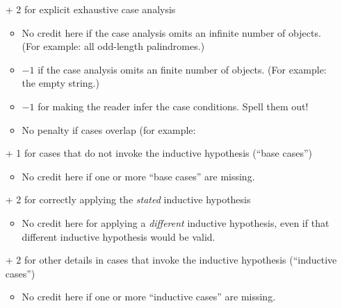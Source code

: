 \documentclass[11pt]{article}
\begin{document}
\begin{enumerate}
\begin{rubric}[induction]
\begin{itemize}
\item[+] 2 for explicit exhaustive case analysis
\begin{itemize}\itemsep0pt
\item No credit here if the case analysis omits an infinite number of objects.  (For example: all odd-length palindromes.)
\item $-1$ if the case analysis omits an finite number of objects.  (For example: the empty string.)
\item $-1$ for making the reader infer the case conditions.  Spell them out!
\item No penalty if cases overlap (for example:
\end{itemize}

\item[+] 1 for cases that do not invoke the inductive hypothesis (“base cases”)
\begin{itemize}\itemsep0pt
\item No credit here if one or more “base cases” are missing.
\end{itemize}

\item[+] 2 for correctly applying the \emph{stated} inductive hypothesis
\begin{itemize}\itemsep0pt
\item No credit here for applying a \emph{different} inductive hypothesis, even if that different inductive hypothesis would be valid.
\end{itemize}

\item[+] 2 for other details in cases that invoke the inductive hypothesis (“inductive cases”)
\begin{itemize}\itemsep0pt
\item No credit here if one or more “inductive cases” are missing.
\end{itemize}
\end{itemize}
\end{rubric}

\end{enumerate}
\end{document}
